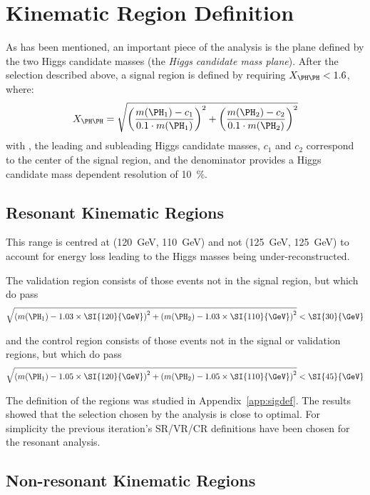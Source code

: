 \section{Kinematic Region Definition}
As has been mentioned, an important piece of the analysis is the plane defined by the 
two Higgs candidate masses (the \emph{Higgs candidate mass plane}). After the selection
described above, a signal region is defined by requiring $X_{\higgs\higgs} < 1.6$, where:
\begin{equation}
	\label{eqn:xhh-def}
	X_{\higgs\higgs} = \sqrt{\qty(\frac{\mh1 - c_1}{0.1\cdot\mh1})^{2} + 
	\qty(\frac{\mh2 - c_2}{0.1\cdot\mh2})^{2}}
\end{equation}
with ,  the leading and subleading Higgs candidate masses, $c_{1}$ and $c_{2}$ correspond
to the center of the signal region, and the denominator provides a Higgs candidate mass 
dependent resolution of 10~\%.

\subsection{Resonant Kinematic Regions}
 

This range is centred at (\SI{120}{\GeV}, \SI{110}{\GeV}) and not
(\SI{125}{\GeV}, \SI{125}{\GeV}) to account for energy loss leading to the Higgs
masses being under-reconstructed.

The validation region consists of those events not in the signal region, but
which do pass
\begin{equation}
	\label{eqn:val-reg-def}
	\sqrt{\qty(\mh1 - 1.03 \times \SI{120}{\GeV})^{2} + \qty(\mh2 - 1.03 \times
		\SI{110}{\GeV})^{2}} < \SI{30}{\GeV}
\end{equation}

and the control region consists of those events not in the signal or validation
regions, but which do pass
\begin{equation}
	\label{eqn:ctrl-reg-def}
	\sqrt{\qty(\mh1 - 1.05 \times \SI{120}{\GeV})^{2} + \qty(\mh2 - 1.05 \times
		\SI{110}{\GeV})^{2}} < \SI{45}{\GeV}
\end{equation}

The definition of the regions was studied in Appendix~\ref{app:sigdef}. The results showed that
the selection chosen by the analysis is close to optimal. For simplicity the previous iteration's
SR/VR/CR definitions have been chosen for the resonant analysis.

\subsection{Non-resonant Kinematic Regions}

